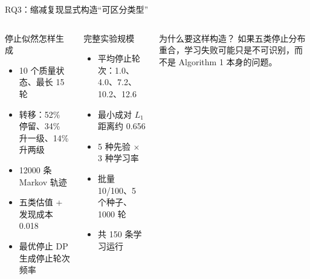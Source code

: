 \begin{frame}{RQ3：缩减复现显式构造“可区分类型”}
\begin{columns}[T,onlytextwidth]
\begin{block}{停止似然怎样生成}
\begin{itemize}
  \item 10 个质量状态、最长 15 轮
  \item 转移：52\% 停留、34\% 升一级、14\% 升两级
  \item 12000 条 Markov 轨迹
  \item 五类估值 + 发现成本 0.018
  \item 最优停止 DP 生成停止轮次频率
\end{itemize}
\end{block}
\begin{block}{完整实验规模}
\begin{itemize}
  \item 平均停止轮次：1.0、4.0、7.2、10.2、12.6
  \item 最小成对 $L_1$ 距离约 0.656
  \item 5 种先验 $\times$ 3 种学习率
  \item 批量 10/100、5 个种子、1000 轮
  \item 共 150 条学习运行
\end{itemize}
\end{block}
\begin{alertblock}{为什么要这样构造？}
如果五类停止分布重合，学习失败可能只是不可识别，而不是 Algorithm 1 本身的问题。
\end{alertblock}
\end{columns}
\end{frame}

